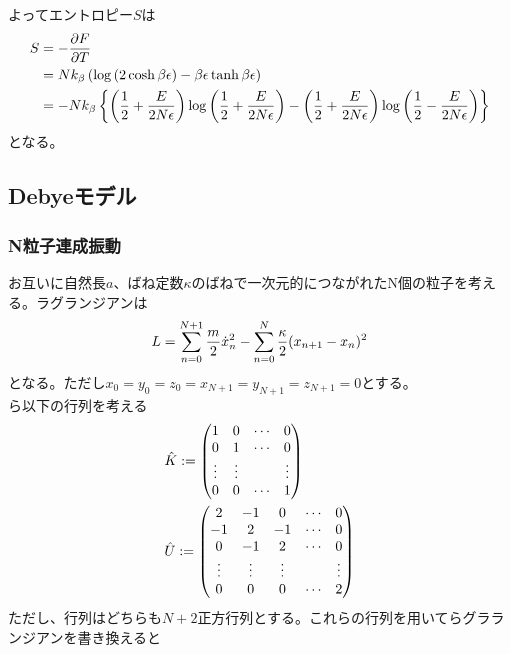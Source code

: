 \documentclass[dvipdfmx, 11pt, a4paper]{jsarticle}
\theoremstyle{definition}
\begin{document}
    よってエントロピー$S$は
    \begin{align}
        S &= -\frac{\partial F}{\partial T} \notag \\
        &= Nk_\beta \left( \log \left( 2\cosh \beta \epsilon \right) - \beta \epsilon \tanh \beta \epsilon \right) \\
        &= -Nk_\beta \left\{ \left( \frac{1}{2} + \frac{E}{2N\epsilon} \right) \log \left( \frac{1}{2} + \frac{E}{2N\epsilon} \right) - \left( \frac{1}{2} + \frac{E}{2N\epsilon} \right) \log \left( \frac{1}{2} - \frac{E}{2N\epsilon} \right) \right\} 
    \end{align}
    となる。
\subsection{Debyeモデル}
\subsubsection{N粒子連成振動}
    お互いに自然長$a$、ばね定数$\kappa$のばねで一次元的につながれたN個の粒子を考える。ラグランジアンは
    \begin{align}
        L = \sum_{n=0}^{N+1} \frac{m}{2}\dot{x}^2_n - \sum_{n=0}^{N} \frac{\kappa}{2}(x_{n+1} - x_n)^2 \notag 
    \end{align}
    となる。ただし$x_0 = y_0 = z_0 = x_{N+1} =  y_{N+1} = z_{N+1} = 0$とする。\\
    ら以下の行列を考える
    \begin{align}
        &\hat{K} := \left(
        \begin{matrix}
            1&0&\cdots&0\\
            0&1&\cdots&0\\
            \vdots&\vdots&&\vdots\\
            0&0&\cdots&1
        \end{matrix}
        \right)\notag \\
        &\hat{U} := \left( 
        \begin{matrix}
            2&-1&0&\cdots&0\\
            -1&2&-1&\cdots&0\\
            0&-1&2&\cdots&0\\
            \vdots&\vdots&\vdots&&\vdots\\
            0&0&0&\cdots&2
        \end{matrix}
        \right) \notag 
    \end{align}
    ただし、行列はどちらも$N+2$正方行列とする。これらの行列を用いてらグラランジアンを書き換えると
\end{document}
